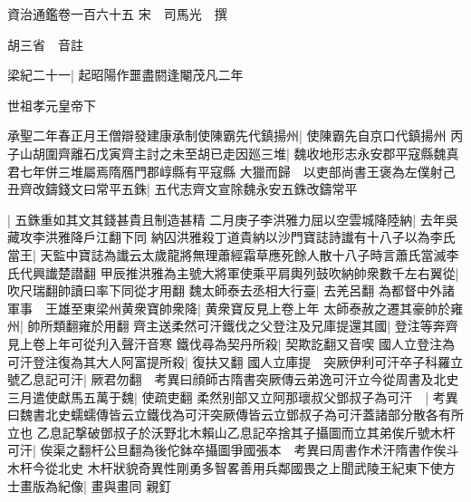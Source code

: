 資治通鑑卷一百六十五
宋　司馬光　撰

胡三省　音註

梁紀二十一|{
	起昭陽作噩盡閼逢閹茂凡二年}


世祖孝元皇帝下

承聖二年春正月王僧辯發建康承制使陳霸先代鎮揚州|{
	使陳霸先自京口代鎮揚州}
丙子山胡圍齊離石戊寅齊主討之未至胡已走因廵三堆|{
	魏收地形志永安郡平寇縣魏真君七年併三堆屬焉隋鴈門郡崞縣有平寇縣}
大獵而歸　以吏部尚書王褒為左僕射己丑齊改鑄錢文曰常平五銖|{
	五代志齊文宣除魏永安五銖改鑄常平}


|{
	五銖重如其文其錢甚貴且制造甚精}
二月庚子李洪雅力屈以空雲城降陸納|{
	去年吳藏攻李洪雅降戶江翻下同}
納囚洪雅殺丁道貴納以沙門寶誌詩䜟有十八子以為李氏當王|{
	天監中寶誌為䜟云太歲龍將無理蕭經霜草應死餘人散十八子時言蕭氏當滅李氏代興䜟楚譛翻}
甲辰推洪雅為主號大將軍使乘平肩輿列鼓吹納帥衆數千左右翼從|{
	吹尺瑞翻帥讀曰率下同從才用翻}
魏太師泰去丞相大行臺|{
	去羌呂翻}
為都督中外諸軍事　王雄至東梁州黄衆寶帥衆降|{
	黄衆寶反見上卷上年}
太師泰赦之遷其豪帥於雍州|{
	帥所類翻雍於用翻}
齊主送柔然可汗鐵伐之父登注及兄庫提還其國|{
	登注等奔齊見上卷上年可從刋入聲汗音寒}
鐵伐尋為契丹所殺|{
	契欺訖翻又音喫}
國人立登注為可汗登注復為其大人阿富提所殺|{
	復扶又翻}
國人立庫提　突厥伊利可汗卒子科羅立號乙息記可汗|{
	厥君勿翻　考異曰顔師古隋書突厥傳云弟逸可汗立今從周書及北史}
三月遣使獻馬五萬于魏|{
	使疏吏翻}
柔然别部又立阿那瓌叔父鄧叔子為可汗　|{
	考異曰魏書北史蠕蠕傳皆云立鐵伐為可汗突厥傳皆云立鄧叔子為可汗蓋諸部分散各有所立也}
乙息記撃破鄧叔子於沃野北木賴山乙息記卒捨其子攝圖而立其弟俟斤號木杆可汗|{
	俟渠之翻杆公旦翻為後佗鉢卒攝圖爭國張本　考異曰周書作术汗隋書作俟斗木杆今從北史}
木杆狀貌奇異性剛勇多智畧善用兵鄰國畏之上聞武陵王紀東下使方士畫版為紀像|{
	畫與畫同}
親釘

